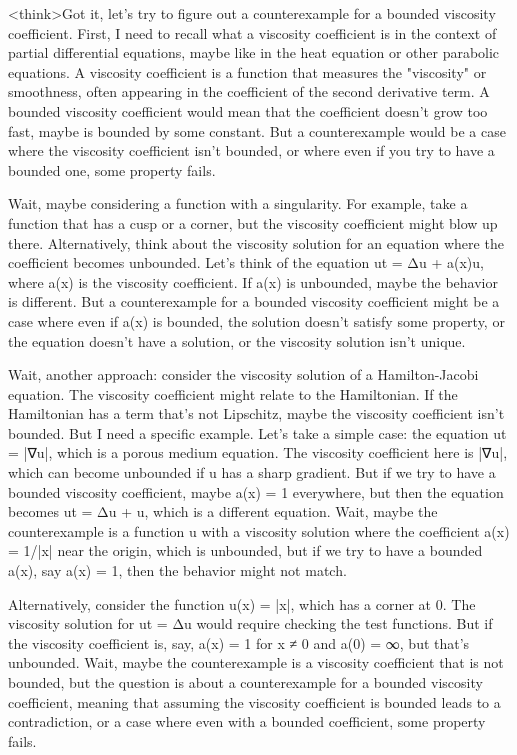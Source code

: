 <think>Got it, let's try to figure out a counterexample for a bounded viscosity coefficient. First, I need to recall what a viscosity coefficient is in the context of partial differential equations, maybe like in the heat equation or other parabolic equations. A viscosity coefficient is a function that measures the "viscosity" or smoothness, often appearing in the coefficient of the second derivative term. A bounded viscosity coefficient would mean that the coefficient doesn't grow too fast, maybe is bounded by some constant. But a counterexample would be a case where the viscosity coefficient isn't bounded, or where even if you try to have a bounded one, some property fails.

Wait, maybe considering a function with a singularity. For example, take a function that has a cusp or a corner, but the viscosity coefficient might blow up there. Alternatively, think about the viscosity solution for an equation where the coefficient becomes unbounded. Let's think of the equation ut = Δu + a(x)u, where a(x) is the viscosity coefficient. If a(x) is unbounded, maybe the behavior is different. But a counterexample for a bounded viscosity coefficient might be a case where even if a(x) is bounded, the solution doesn't satisfy some property, or the equation doesn't have a solution, or the viscosity solution isn't unique.

Wait, another approach: consider the viscosity solution of a Hamilton-Jacobi equation. The viscosity coefficient might relate to the Hamiltonian. If the Hamiltonian has a term that's not Lipschitz, maybe the viscosity coefficient isn't bounded. But I need a specific example. Let's take a simple case: the equation ut = |∇u|, which is a porous medium equation. The viscosity coefficient here is |∇u|, which can become unbounded if u has a sharp gradient. But if we try to have a bounded viscosity coefficient, maybe a(x) = 1 everywhere, but then the equation becomes ut = Δu + u, which is a different equation. Wait, maybe the counterexample is a function u with a viscosity solution where the coefficient a(x) = 1/|x| near the origin, which is unbounded, but if we try to have a bounded a(x), say a(x) = 1, then the behavior might not match.

Alternatively, consider the function u(x) = |x|, which has a corner at 0. The viscosity solution for ut = Δu would require checking the test functions. But if the viscosity coefficient is, say, a(x) = 1 for x ≠ 0 and a(0) = ∞, but that's unbounded. Wait, maybe the counterexample is a viscosity coefficient that is not bounded, but the question is about a counterexample for a bounded viscosity coefficient, meaning that assuming the viscosity coefficient is bounded leads to a contradiction, or a case where even with a bounded coefficient, some property fails.

